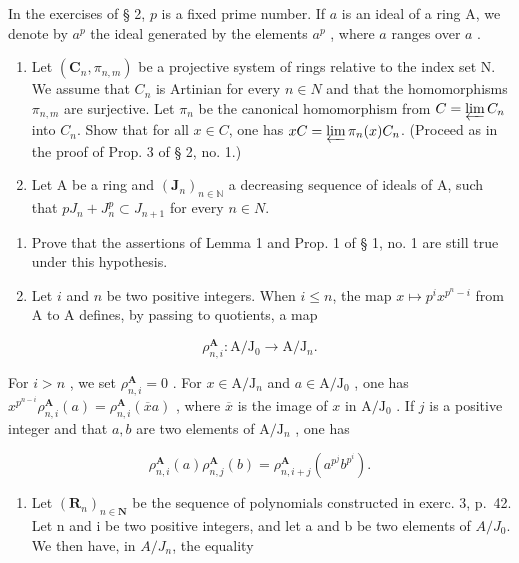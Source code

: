 
In the exercises of § 2, \(p\) is a fixed prime number. If \(a\) is an ideal of a ring A, we denote by \(a^p\) the ideal generated by the elements \(a^p\) , where \(a\) ranges over \(a\) .

\begin{enumerate}
\def\labelenumi{\arabic{enumi})}
\item
  Let \((\mathbf{C}_{n}, \pi_{n,m})\) be a projective system of rings relative to the index set N. We assume that \(C_{n}\) is Artinian for every \(n \in N\) and that the homomorphisms \(\pi_{n,m}\) are surjective. Let \(\pi_{n}\) be the canonical homomorphism from \(C = \varprojlim C_{n}\) into \(C_{n}\). Show that for all \(x \in C\), one has \(xC = \varprojlim \pi_{n}(x) C_{n}\). (Proceed as in the proof of Prop. 3 of § 2, no. 1.)
\item
  Let A be a ring and \((\mathbf{J}_{n})_{n\in\mathbb{N}}\) a decreasing sequence of ideals of A, such that \(pJ_{n} + J_{n}^{p} \subset J_{n+1}\) for every \(n \in N\).
\end{enumerate}

\begin{enumerate}
\def\labelenumi{\alph{enumi})}
\item
  Prove that the assertions of Lemma 1 and Prop. 1 of § 1, no. 1 are still true under this hypothesis.
\item
  Let \(i\) and \(n\) be two positive integers. When \(i \leqslant n\), the map \(x \mapsto p^i x^{p^n - i}\) from A to A defines, by passing to quotients, a map
\end{enumerate}

\[
\rho_ {n, i} ^ {\mathbf {A}}: \mathrm{A} / \mathrm{J} _ {0} \rightarrow \mathrm{A} / \mathrm{J} _ {n}.
\]

For \(i > n\) , we set \(\rho_{n,i}^{\mathbf{A}} = 0\) . For \(x \in \mathrm{A} / \mathrm{J}_n\) and \(a \in \mathrm{A} / \mathrm{J}_0\) , one has \(x^{p^{n - i}} \rho_{n,i}^{\mathbf{A}}(a) = \rho_{n,i}^{\mathbf{A}}(\overline{x} a)\) , where \(\overline{x}\) is the image of \(x\) in \(\mathrm{A} / \mathrm{J}_0\) . If \(j\) is a positive integer and that \(a, b\) are two elements of \(\mathrm{A} / \mathrm{J}_n\) , one has

\[
\rho_ {n, i} ^ {\mathbf {A}} (a) \rho_ {n, j} ^ {\mathbf {A}} (b) = \rho_ {n, i + j} ^ {\mathbf {A}} \left(a ^ {p ^ {j}} b ^ {p ^ {i}}\right).
\]

\begin{enumerate}
\def\labelenumi{\alph{enumi})}
\setcounter{enumi}{2}
\tightlist
\item
  Let \((\mathbf{R}_{n})_{n\in\mathbf{N}}\) be the sequence of polynomials constructed in exerc. 3, p.~42. Let n and i be two positive integers, and let a and b be two elements of \(A/J_{0}\). We then have, in \(A/J_{n}\), the equality
\end{enumerate}

